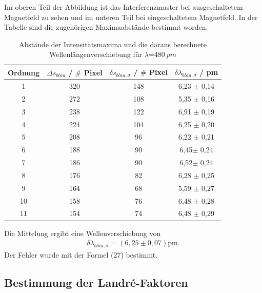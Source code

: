 \documentclass{article}
\begin{document}
Im oberen Teil der Abbildung ist das Interferenzmuster bei ausgeschaltetem Magnetfeld zu sehen und im unteren Teil bei eingeschaltetem Magnetfeld. In der Tabelle sind die zugehörigen Maximaabstände bestimmt worden. 

\begin{table} [H]
	\centering
	\caption{Abstände der Intensitätsmaxima und die daraus berechnete Wellenlängenverschiebung für $\lambda$=$\SI{480}{pm}$}
	\label {tab:threecols}
	\begin{tabular}{c|c|c|c} \hline		
		Ordnung & $\Delta s_{blau}$ / $\#$ Pixel& $\delta s_{blau,\sigma}$ / $\#$ Pixel& $\delta\lambda_{blau,\sigma}$ / pm \\ 
		\hline 
		1 & 320& 148& 6,23 $\pm$ 0,14 \\
		2 & 272 & 108& 5,35 $\pm$ 0,16 \\
		3 & 238 & 122 & 6,91 $\pm$ 0,19 \\
		4 & 224& 104& 6,25 $\pm$ 0,20 \\
		5 & 208& 96& 6,22 $\pm$ 0,21 \\
		6 & 188& 90& 6,45$\pm$ 0,24 \\
		7 & 186& 90& 6,52$\pm$ 0,24\\
		8 & 176& 82& 6,28 $\pm$ 0,25 \\
		9 & 164& 68& 5,59 $\pm$ 0,27 \\
		10 & 158& 76& 6,48 $\pm$ 0,28\\
		11 & 154& 74& 6,48 $\pm$ 0,29 \\
		
		
		\hline
	\end{tabular} 	
	
	\label {tab:threecols}
\end{table}
Die Mittelung ergibt eine Wellenverschiebung von 
\begin{align*}
\delta\lambda_{blau, \sigma}=(6,25\pm0,07)\text{pm}.
\end{align*}
Der Fehler wurde mit der Formel (27) bestimmt. 

\subsection{Bestimmung der Landré-Faktoren}
\end{document}
